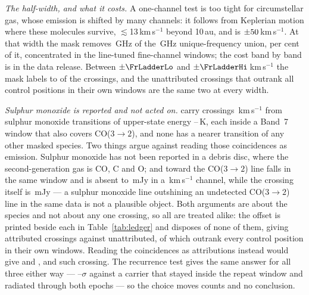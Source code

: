\emph{The half-width, and what it costs.} A one-channel test is too tight for
circumstellar gas, whose emission is shifted by many channels: it follows
from Keplerian motion where these molecules survive,
$\lesssim$13\,km\,s$^{-1}$ beyond 10\,au, and is
$\pm50$\,km\,s$^{-1}$. At that width the mask removes
\FrMaskLostGHz\,GHz of the \FrMaskUnionGHz\,GHz unique-frequency union,
\FrMaskPct{} per cent of it, concentrated in the line-tuned fine-channel
windows; the cost band by band is in the data release.
Between $\pm\FrLadderLo$ and $\pm\FrLadderHi$\,km\,s$^{-1}$ the mask labels
\FrAttrWTwenty{} to \FrAttrWHundred{} of the \NCross{} crossings, and the
\FrNRankPass{} unattributed crossings that outrank all \NCtrl{} control
positions in their own windows are the same two at every width.

\begin{table}
\centering
\footnotesize
\caption{The line mask, by species: the number of transitions $N$ it holds,
the frequency range they span inside the searched intervals and their
upper-state energies. Hydrogen recombination lines carry no tabulated
$E_{\rm u}$. The transition-by-transition list is in the data release.}
\label{tab:masklines}

\end{table}

\emph{Sulphur monoxide is reported and not acted on.} \MkSOStars{} carry
crossings \MkSODvList\,km\,s$^{-1}$ from sulphur monoxide transitions of
upper-state energy \MkSOEuLo--\MkSOEuHi\,K, each inside a Band~7 window that
also covers CO($3\to2$), and none has a nearer transition of any other
masked species. Two things argue against reading those coincidences as
emission. Sulphur monoxide has not been reported in a debris disc, where the
second-generation gas is CO, C and O; and toward \FrCpStar{} the CO($3\to2$)
line falls in the same window and is absent to \FrCpCoLimMJy\,mJy in a
\FrCpCoChanKms\,km\,s$^{-1}$ channel, while the crossing itself is
\FrCpFluxMJy\,mJy --- a sulphur monoxide line outshining an undetected
CO($3\to2$) line in the same data is not a plausible object. Both arguments
are about the species and not about any one crossing, so all \MkNSODecide{}
are treated alike: the offset is printed beside each in
Table~\ref{tab:ledger} and disposes of none of them, giving
\MkAttr{} attributed crossings against \MkUnattr{} unattributed, of which
\MkRankLeadWord{} outrank every control position in their own windows.
Reading the coincidences as attributions instead would give \MkAttrAlt{} and
\MkUnattrAlt, and \MkRankLeadAlt{} such crossing. The recurrence test gives
the same answer for all three either way --- \MkAttrExclLo--\MkAttrExclHi$\sigma$
against a carrier that stayed inside the repeat window and radiated through
both epochs --- so the choice moves counts and no conclusion.

